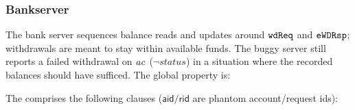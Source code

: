 \subsubsection*{Bankserver}
The bank server sequences balance reads and updates around \(\boldsymbol{{\tt wdReq}}\) and \(\boldsymbol{{\tt eWDRsp}}\); withdrawals are meant to stay within available funds. The buggy server still reports a failed withdrawal on \(\mathit{ac}\) (\(\neg\mathit{status}\)) in a situation where the recorded balances should have sufficed. The global property is:
\vspace{-.35cm}\par{}
\vspace{-.4cm}\par\nobreak\noindent
The \tyName{} comprises the following clauses (\(\mathsf{aid}/\mathsf{rid}\) are phantom account/request ids):
